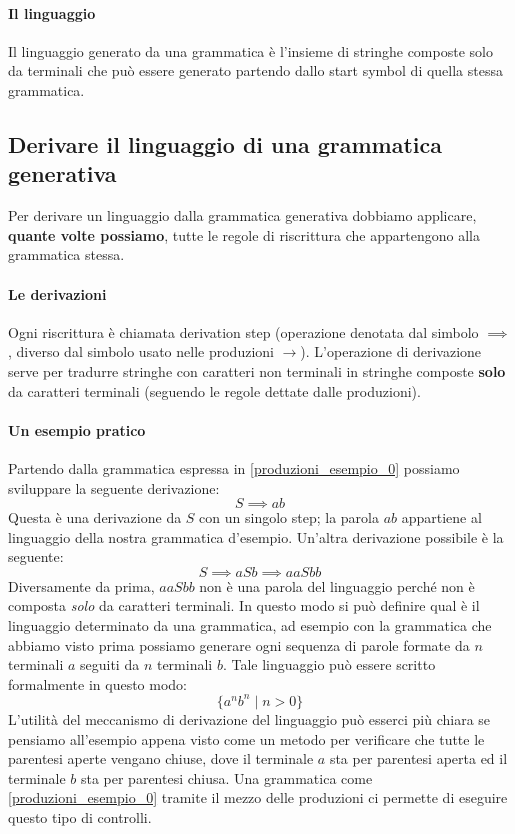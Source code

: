 \documentclass[class=book, crop=false, oneside, 12pt]{standalone}
\begin{document}
\paragraph{Il linguaggio}
Il linguaggio generato da una grammatica è l’insieme di stringhe composte solo da terminali che può essere generato partendo dallo start symbol di quella stessa grammatica.

\subsection{Derivare il linguaggio di una grammatica generativa}
Per derivare un linguaggio dalla grammatica generativa dobbiamo applicare, \textbf{quante volte possiamo}, tutte le regole di riscrittura che appartengono alla grammatica stessa. 

\paragraph{Le derivazioni}
Ogni riscrittura è chiamata derivation step (operazione denotata dal simbolo \(\implies\), diverso dal simbolo usato nelle produzioni \(\to\)). L’operazione di derivazione serve per tradurre stringhe con caratteri non terminali in stringhe composte \textbf{solo} da caratteri terminali (seguendo le regole dettate dalle produzioni).

\paragraph{Un esempio pratico}
Partendo dalla grammatica espressa in \ref{produzioni_esempio_0} possiamo sviluppare la seguente derivazione:
\begin{equation}
    S \implies ab
\end{equation}
Questa è una derivazione da \(S\) con un singolo step; la parola \(ab\) appartiene al linguaggio della nostra grammatica d’esempio.
Un'altra derivazione possibile è la seguente:
\begin{equation}
    S \implies aSb \implies aaSbb
\end{equation}
Diversamente da prima, \(aaSbb\) non è una parola del linguaggio perché non è composta \emph{solo} da caratteri terminali. In questo modo si può definire qual è il linguaggio determinato da una grammatica, ad esempio con la grammatica che abbiamo visto prima possiamo generare ogni sequenza di parole formate da \(n\) terminali \(a\) seguiti da \(n\) terminali \(b\).
Tale linguaggio può essere scritto formalmente in questo modo:
\begin{equation}
    \{a^n b^n \mid n>0\}
\end{equation}
L'utilità del meccanismo di derivazione del linguaggio può esserci più chiara se pensiamo all'esempio appena visto come un metodo per verificare che tutte le parentesi aperte vengano chiuse, dove il terminale \(a\) sta per parentesi aperta ed il terminale \(b\) sta per parentesi chiusa. Una grammatica come \ref{produzioni_esempio_0} tramite il mezzo delle produzioni ci permette di eseguire questo tipo di controlli.
\end{document}
